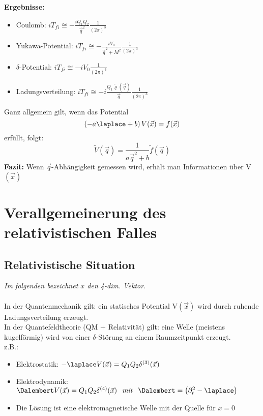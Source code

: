 \textbf{Ergebnisse:} 
\begin{itemize}
	\item Coulomb: \hspace{1,3cm} $ i T_{fi} \cong - \frac{iQ_1 Q_2}{\vec{q}^2} 
	\frac{1}{(2\pi)^3} $
	\item Yukawa-Potential: $ i T_{fi} \cong - \frac{i V_0}{\vec{q}^2 + M^2} 
	\frac{1}{(2\pi)^3} $
	\item $\delta$-Potential: \hspace{1,2cm} $ i T_{fi} \cong - i V_0 
	\frac{1}{(2\pi)^3} $
	\item Ladungsverteilung:  $ i T_{fi} \cong - i \frac{Q_1 
	\tilde{\varrho}(\vec{q})}{\vec{q}} \frac{1}{(2\pi)^3} $
\end{itemize}
Ganz allgemein gilt, wenn das Potential 
\[ \left( -a \laplace + b \right) V(\vec{x}) = f(\vec{x}) \]
erfüllt, folgt:
\[ \tilde{V}(\vec{q}) = \frac{1}{a\vec{q}^2 + b} \tilde{f}(\vec{q}) \] 
\textbf{Fazit:} Wenn $\vec{q}$-Abhängigkeit gemessen wird, erhält man 
Informationen über V$(\vec{x})$

\section{Verallgemeinerung des relativistischen Falles}

\subsection{Relativistische Situation}

\textit{Im folgenden bezeichnet $x$ den 4-dim. Vektor.}\\
\\
In der Quantenmechanik gilt: ein statisches Potential V$(\vec{x})$ wird durch 
ruhende Ladungsverteilung erzeugt. \\
In der Quantefeldtheorie (QM + Relativität) gilt: eine Welle (meistens 
kugelförmig) wird von einer $\delta$-Störung an einem Raumzeitpunkt erzeugt. \\
z.B.: 
\begin{itemize}
	\item Elektrostatik: $-\laplace V(\vec{x}) = Q_1 Q_2 \delta^{(3)} (\vec{x}) 
	$
	\item Elektrodynamik: $\Dalembert V(\vec{x}) = Q_1 Q_2 \delta^{(4)} 
	(\vec{x}) \hspace{0,25cm} \mathit{mit} \hspace{0,25cm}  \Dalembert = \left( 
	\partial_t^2 - \laplace \right) $
	\item[] Die Lösung ist eine elektromagnetische Welle mit der Quelle für 
	$x=0$
\end{itemize}

